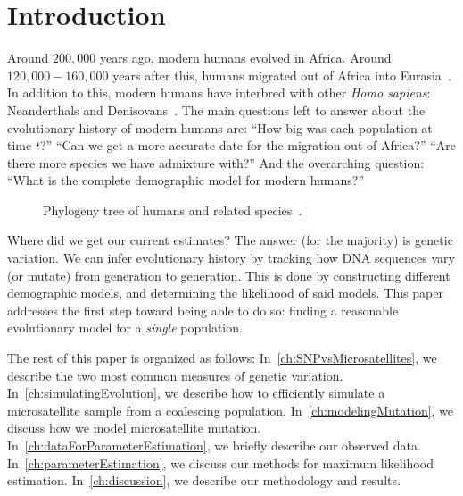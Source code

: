 \chapter{Introduction}\label{ch:introduction}
Around $200,000$ years ago, modern humans evolved in Africa.
Around $120,000-160,000$ years after this, humans migrated out of Africa into
Eurasia~\cite{campbellEvolutionHumanGenetic2010}.
In addition to this, modern humans have interbred with other \textit{Homo sapiens}: Neanderthals and
Denisovans~\cite{sankararamanCombinedLandscapeDenisovan2016}.
The main questions left to answer about the evolutionary history of modern humans are:
``How big was each population at time $t$?''
``Can we get a more accurate date for the migration out of Africa?''
``Are there more species we have admixture with?''
And the overarching question: ``What is the complete demographic model for modern humans?''
\begin{figure}[th]
    \caption{
    Phylogeny tree of humans and related species~\cite{riceReview18Organic}.
    }\label{fig:overviewEvolution}
\end{figure}

Where did we get our current estimates?
The answer (for the majority) is genetic variation.
We can infer evolutionary history by tracking how DNA sequences vary (or mutate) from generation to generation.
This is done by constructing different demographic models, and determining the likelihood of said models.
This paper addresses the first step toward being able to do so: finding a reasonable evolutionary model for a
\emph{single} population.

The rest of this paper is organized as follows:
In~\autoref{ch:SNPvsMicrosatellites}, we describe the two most common measures of genetic variation.
In~\autoref{ch:simulatingEvolution}, we describe how to efficiently simulate a microsatellite sample from a coalescing
population.
In~\autoref{ch:modelingMutation}, we discuss how we model microsatellite mutation.
In~\autoref{ch:dataForParameterEstimation}, we briefly describe our observed data.
In~\autoref{ch:parameterEstimation}, we discuss our methods for maximum likelihood estimation.
In~\autoref{ch:discussion}, we describe our methodology and results.
